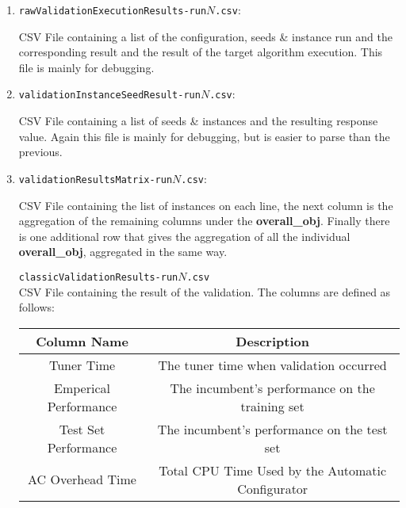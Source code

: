 \documentclass[manual.tex]{subfiles}
\begin{document}
\begin{enumerate}


\item \texttt{rawValidationExecutionResults-run$N$.csv}:

 CSV File containing a list of the configuration, 
seeds \& instance run and the corresponding result and the result of the target algorithm execution. This file is mainly for debugging.

\item 
\texttt{validationInstanceSeedResult-run$N$.csv}:

 CSV File containing a list of seeds \&
instances and the resulting response value. Again this file is mainly for debugging, but is easier to parse than the previous.
\item 
\texttt{validationResultsMatrix-run$N$.csv}:

CSV File containing the list of instances
on each line, the next column is the aggregation of the remaining columns under the 
\textbf{overall\_obj}. Finally there is one additional row that
gives the aggregation of all the individual \textbf{overall\_obj},
aggregated in the same way.

\texttt{classicValidationResults-run$N$.csv}
\\
CSV File containing the result of the validation. The columns are defined as follows:

\begin{tabular}{|c|c|}
\hline 
Column Name & Description\tabularnewline
\hline 
\hline 
Tuner Time &  The tuner time when validation occurred \tabularnewline
\hline 
Emperical Performance & The incumbent's performance on the training set \tabularnewline
\hline 
Test Set Performance & The incumbent's performance on the test set \tabularnewline
\hline
AC Overhead Time & Total CPU Time Used by the Automatic Configurator  \tabularnewline
\hline 

\end{tabular}




\end{enumerate}
\end{document}
